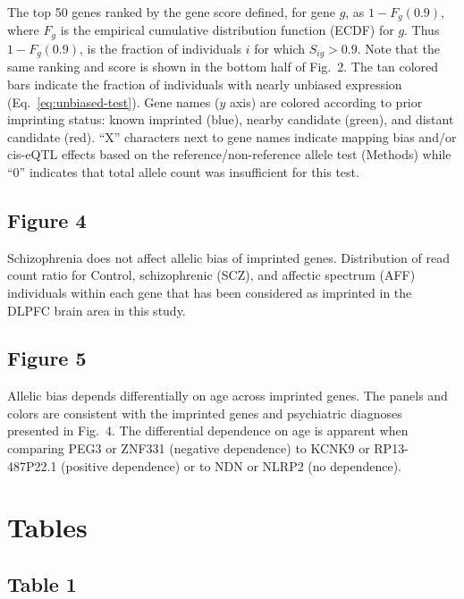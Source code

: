 \documentclass[letterpaper]{article}
\begin{document}
The top 50 genes ranked by the gene score defined, for gene \(g\), as \(1 -
F_g(0.9)\), where \(F_g\) is the empirical cumulative distribution function
(ECDF) for \(g\).  Thus \(1 - F_g(0.9)\), is the fraction of individuals \(i\)
for which \(S_{ig}>0.9\).  Note that the same ranking and score is shown in
the bottom half of Fig.~2.  The tan colored bars
indicate the fraction of individuals with nearly unbiased expression
(Eq.~\ref{eq:unbiased-test}).  Gene names (\(y\) axis) are colored according
to prior imprinting status: known imprinted (blue), nearby candidate (green),
and distant candidate (red).  ``X'' characters next to gene names indicate
mapping bias and/or cis-eQTL effects based on the reference/non-reference
allele test (Methods) while ``0'' indicates that total allele count was
insufficient for this test.

\subsection*{Figure 4}

Schizophrenia does not affect allelic bias of imprinted genes.
Distribution of read count ratio for Control, schizophrenic (SCZ), and
affectic spectrum (AFF) individuals within each gene that has been considered as imprinted in the DLPFC
brain area in this study.

\subsection*{Figure 5}

Allelic bias depends differentially on age across imprinted genes.
The panels and colors are consistent with the imprinted genes and psychiatric diagnoses
presented in Fig.~4.  The differential dependence on age is apparent
when comparing PEG3 or ZNF331 (negative dependence) to KCNK9 or RP13-487P22.1
(positive dependence) or to NDN or NLRP2 (no dependence).

\section*{Tables}

\subsection*{Table 1}
\end{document}
